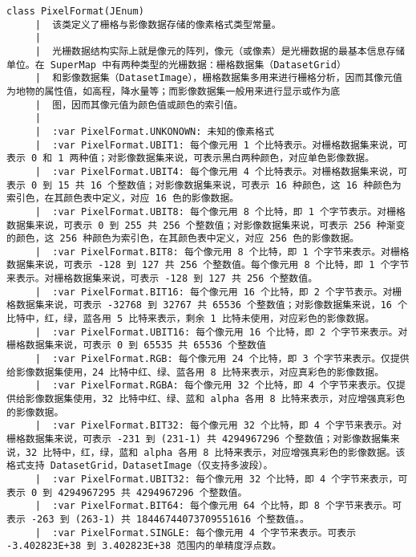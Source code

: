 \documentclass[11pt]{article}
\begin{document}
\begin{Verbatim}[commandchars=\\\{\}]
    class PixelFormat(JEnum)
     |  该类定义了栅格与影像数据存储的像素格式类型常量。
     |  
     |  光栅数据结构实际上就是像元的阵列，像元（或像素）是光栅数据的最基本信息存储单位。在 SuperMap 中有两种类型的光栅数据：栅格数据集（DatasetGrid）
     |  和影像数据集（DatasetImage），栅格数据集多用来进行栅格分析，因而其像元值为地物的属性值，如高程，降水量等；而影像数据集一般用来进行显示或作为底
     |  图，因而其像元值为颜色值或颜色的索引值。
     |  
     |  :var PixelFormat.UNKONOWN: 未知的像素格式
     |  :var PixelFormat.UBIT1: 每个像元用 1 个比特表示。对栅格数据集来说，可表示 0 和 1 两种值；对影像数据集来说，可表示黑白两种颜色，对应单色影像数据。
     |  :var PixelFormat.UBIT4: 每个像元用 4 个比特表示。对栅格数据集来说，可表示 0 到 15 共 16 个整数值；对影像数据集来说，可表示 16 种颜色，这 16 种颜色为索引色，在其颜色表中定义，对应 16 色的影像数据。
     |  :var PixelFormat.UBIT8: 每个像元用 8 个比特，即 1 个字节表示。对栅格数据集来说，可表示 0 到 255 共 256 个整数值；对影像数据集来说，可表示 256 种渐变的颜色，这 256 种颜色为索引色，在其颜色表中定义，对应 256 色的影像数据。
     |  :var PixelFormat.BIT8: 每个像元用 8 个比特，即 1 个字节来表示。对栅格数据集来说，可表示 -128 到 127 共 256 个整数值。每个像元用 8 个比特，即 1 个字节来表示。对栅格数据集来说，可表示 -128 到 127 共 256 个整数值。
     |  :var PixelFormat.BIT16: 每个像元用 16 个比特，即 2 个字节表示。对栅格数据集来说，可表示 -32768 到 32767 共 65536 个整数值；对影像数据集来说，16 个比特中，红，绿，蓝各用 5 比特来表示，剩余 1 比特未使用，对应彩色的影像数据。
     |  :var PixelFormat.UBIT16: 每个像元用 16 个比特，即 2 个字节来表示。对栅格数据集来说，可表示 0 到 65535 共 65536 个整数值
     |  :var PixelFormat.RGB: 每个像元用 24 个比特，即 3 个字节来表示。仅提供给影像数据集使用，24 比特中红、绿、蓝各用 8 比特来表示，对应真彩色的影像数据。
     |  :var PixelFormat.RGBA: 每个像元用 32 个比特，即 4 个字节来表示。仅提供给影像数据集使用，32 比特中红、绿、蓝和 alpha 各用 8 比特来表示，对应增强真彩色的影像数据。
     |  :var PixelFormat.BIT32: 每个像元用 32 个比特，即 4 个字节来表示。对栅格数据集来说，可表示 -231 到 (231-1) 共 4294967296 个整数值；对影像数据集来说，32 比特中，红，绿，蓝和 alpha 各用 8 比特来表示，对应增强真彩色的影像数据。该格式支持 DatasetGrid，DatasetImage（仅支持多波段）。
     |  :var PixelFormat.UBIT32: 每个像元用 32 个比特，即 4 个字节来表示，可表示 0 到 4294967295 共 4294967296 个整数值。
     |  :var PixelFormat.BIT64: 每个像元用 64 个比特，即 8 个字节来表示。可表示 -263 到 (263-1) 共 18446744073709551616 个整数值。。
     |  :var PixelFormat.SINGLE: 每个像元用 4 个字节来表示。可表示 -3.402823E+38 到 3.402823E+38 范围内的单精度浮点数。

\end{Verbatim}
\end{document}
